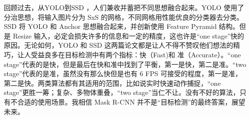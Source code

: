 回顾过去，从YOLO到SSD ，人们兼收并蓄把不同思想融合起来。YOLO 使用了分治思想，将输入图片分为 SxS 的网格，不同网格用性能优良的分类器去分类。SSD 将 YOLO 和 Anchor 思想融合起来，并创新使用 Feature Pyramid 结构。但是 Resize 输入，必定会损失许多的信息和一定的精度，这也许是“one stage”快的原因。无论如何，YOLO 和 SSD 这两篇论文都是让人不得不赞叹他们想法的精巧，让人受益良多在目标检测中有两个指标：快（Fast)和 准（Accurate）。“one stage”代表的是快，但是最后在快和准中找到了平衡，第一是快，第二是准。“two stage”代表的是准，虽然没有那么快但是也有 6 FPS 可接受的程度，第一是准，第二是快。两类算法都有其适用的范围，比如说实时快速动作捕捉，“one stage”更胜一筹；复杂、多物体重叠，“two stage”当仁不让。没有不好的算法，只有不合适的使用场景。我相信 Mask R-CNN 并不是“目标检测”的最终答案，展望未来。